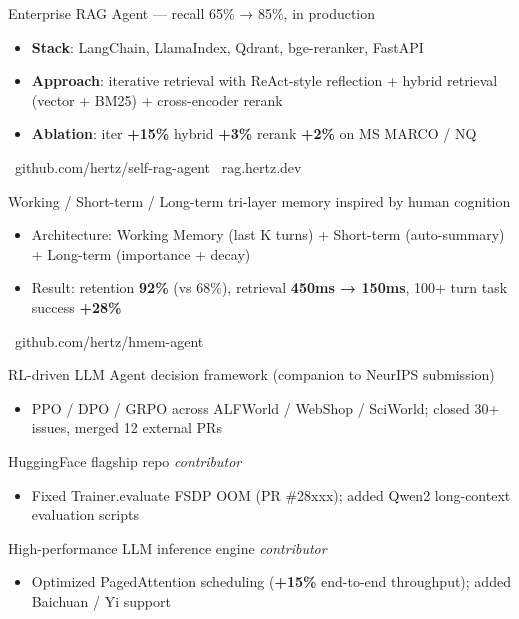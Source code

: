 

{Enterprise RAG Agent — recall 65\% → 85\%, in production}{%
\begin{itemize}
  \item \textbf{Stack}: LangChain, LlamaIndex, Qdrant, bge-reranker, FastAPI
  \item \textbf{Approach}: iterative retrieval with ReAct-style reflection + hybrid retrieval (vector + BM25) + cross-encoder rerank
  \item \textbf{Ablation}: iter \textbf{+15\%} \textbullet{} hybrid \textbf{+3\%} \textbullet{} rerank \textbf{+2\%} on MS MARCO / NQ
\end{itemize}
}{\faGithub\ github.com/hertz/self-rag-agent \quad \faGlobe\ rag.hertz.dev}

{Working / Short-term / Long-term tri-layer memory inspired by human cognition}{%
\begin{itemize}
  \item Architecture: Working Memory (last K turns) + Short-term (auto-summary) + Long-term (importance + decay)
  \item Result: retention \textbf{92\%} (vs 68\%), retrieval \textbf{450ms → 150ms}, 100+ turn task success \textbf{+28\%}
\end{itemize}
}{\faGithub\ github.com/hertz/hmem-agent}


{RL-driven LLM Agent decision framework (companion to NeurIPS submission)}{%
\begin{itemize}
  \item PPO / DPO / GRPO across ALFWorld / WebShop / SciWorld; closed 30+ issues, merged 12 external PRs
\end{itemize}
}

{HuggingFace flagship repo \textbullet{} \textit{contributor}}{%
\begin{itemize}
  \item Fixed Trainer.evaluate FSDP OOM (PR \#28xxx); added Qwen2 long-context evaluation scripts
\end{itemize}
}

{High-performance LLM inference engine \textbullet{} \textit{contributor}}{%
\begin{itemize}
  \item Optimized PagedAttention scheduling (\textbf{+15\%} end-to-end throughput); added Baichuan / Yi support
\end{itemize}
}
